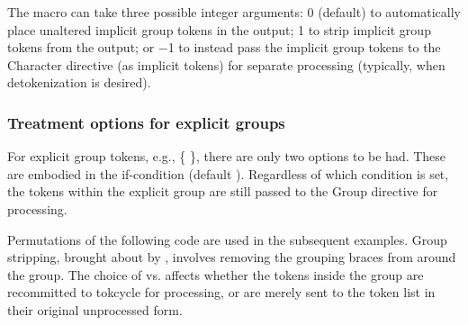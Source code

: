 \documentclass[10pt]{article}
\newcommand\TokCycle{\textsf{tokcycle}}
\begin{document}
\begingroup

The macro
 can take three possible
  integer arguments: 0 (default) to automatically place unaltered
  implicit group tokens in the  output; 1 to strip
  implicit group tokens from the output; or $-$1 to instead pass the
  implicit group tokens to the Character directive (as implicit
  tokens) for separate processing (typically, when detokenization
  is desired).




\endgroup

\subsubsection{Treatment options for explicit groups}

\begingroup

For explicit group tokens, e.g., \{ \}, there are only two 
  options to be had.
These are embodied in the if-condition  
  (default ).
Regardless of which condition is set, the tokens within the explicit
  group are still passed to the Group directive for processing.

\medskip
Permutations of the following code are used in the subsequent examples.
Group stripping, brought about by ,
  involves removing the grouping braces from around the group.
The choice of  vs.\@ {}
  affects whether the tokens inside the group are recommitted
  to \TokCycle{} for processing, or are merely sent to the
   token list in their original unprocessed form.
\end{document}
